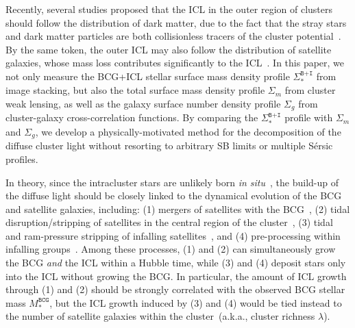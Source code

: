 \documentclass[fleqn,usenatbib]{mnras}
\newcommand{\sigbi}{\Sigma_*^{\texttt{B+I}}}
\newcommand{\sigm}{\Sigma_m}
\newcommand{\sigg}{\Sigma_g}
\newcommand{\msbcg}{M_*^{\texttt{BCG}}}
\begin{document}
Recently, several studies proposed that the ICL in the outer region of
clusters should follow the distribution of dark matter, due to the fact
that the stray stars and dark matter particles are both collisionless
tracers of the cluster potential~\citep{Montes2019, AlonsoAsensio2020,
SampaioSantos2021}. By the same token, the outer ICL may also follow the
distribution of satellite galaxies, whose mass loss contributes
significantly to the ICL~\citep{Purcell2007, Martel2012, Contini2014,
Morishita2017}. In this paper, we not only measure the BCG+ICL stellar
surface mass density profile $\sigbi$ from image stacking, but also the
total surface mass density profile $\sigm$ from cluster weak lensing, as
well as the galaxy surface number density profile $\sigg$ from
cluster-galaxy cross-correlation functions. By comparing the $\sigbi$
profile with $\sigm$ and $\sigg$, we develop a physically-motivated method
for the decomposition of the diffuse cluster light without resorting to
arbitrary SB limits or multiple S\'ersic profiles.


In theory, since the intracluster stars are unlikely born {\it in
situ}~\citep{Puchwein2010, Melnick2012}, the build-up of the diffuse light
should be closely linked to the dynamical evolution of the BCG and
satellite galaxies, including: (1) mergers of satellites with the
BCG~\citep{Murante2007, Burke2015}, (2) tidal disruption/stripping of
satellites in the central region of the cluster~\citep{Purcell2007,
Wetzel2010, Montes2014, DeMaio2015, Contini2018}, (3) tidal and
ram-pressure stripping of infalling satellites~\citep{Rudick2009,
Contini2014, Montes2018, DeMaio2018, Contini2019, JimenezTeja2018}, and (4)
pre-processing within infalling groups~\citep{Willman2004,
SommerLarsen2006, Rudick2006}.  Among these processes, (1) and (2) can
simultaneously grow the BCG {\it and} the ICL within a Hubble time, while
(3) and (4) deposit stars only into the ICL without growing the BCG.  In
particular, the amount of ICL growth through (1) and (2) should be strongly
correlated with the observed BCG stellar mass $\msbcg$, but the ICL growth
induced by (3) and (4) would be tied instead to the number of satellite
galaxies within the cluster~(a.k.a., cluster richness $\lambda$).
\end{document}
